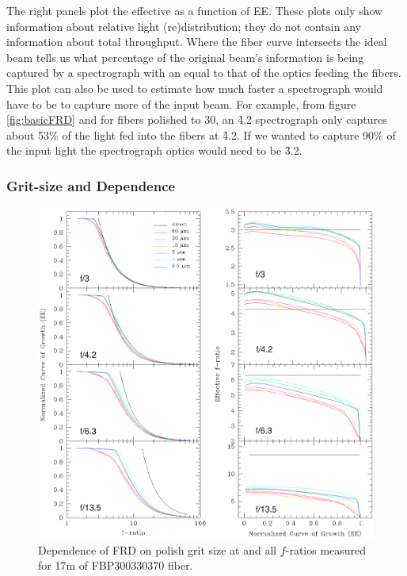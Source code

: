 The right panels plot the effective \fratio as a function of
EE. These plots only show information about relative light
(re)distribution; they do not contain any information about total
throughput.  Where the fiber curve intersects the ideal beam tells us
what percentage of the original beam's information is being captured
by a spectrograph with an \fratio equal to that of the optics feeding
the fibers. This plot can also be used to estimate how much faster a
spectrograph would have to be to capture more of the input beam. For
example, from figure \ref{fig:basicFRD} and for fibers polished to 30\mum, an \f4.2
spectrograph only captures about 53\% of the light fed into the fibers 
at \f4.2. If we wanted to capture 90\% of the input light the
spectrograph optics would need to be \f3.2.

\subsubsection{Grit-size and \fratio Dependence}
\label{FRD:sec:gritwave}
\begin{figure}[htp]
  \centering
  \includegraphics[width=\textwidth]{FRD/figs/gritplot.eps}
  \caption[Dependence of FRD on polish
    level]{\fixspacing\label{fig:grit}Dependence of FRD on polish grit size at
    \filty and all $f$-ratios measured for 17m of FBP300330370 fiber.}
\end{figure}

